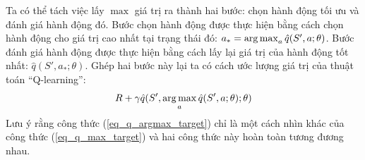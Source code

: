 	Ta có thể tách việc lấy $\max$ giá trị ra thành hai bước: chọn hành động tối ưu và đánh giá hành động đó.
	Bước chọn hành động được thực hiện bằng cách chọn hành động cho giá trị cao nhất tại trạng thái đó: $a_{*} = \operatorname*{arg\,max}_{a}\hat{q}(S', a;\theta)$.
	Bước đánh giá hành động được thực hiện bằng cách lấy lại giá trị của hành động tốt nhất: $\hat{q}(S', a_{*};\theta)$.
	Ghép hai bước này lại ta có cách ước lượng giá trị của thuật toán ``Q-learning'':
	\begin{equation}
		\label{eq_q_argmax_target}
		R + \gamma \hat{q}(S', \operatorname*{arg\,max}_{a}\hat{q}(S', a;\theta); \theta)
	\end{equation}
	Lưu ý rằng công thức (\ref{eq_q_argmax_target}) chỉ là một cách nhìn khác của công thức (\ref{eq_q_max_target}) và hai công thức này hoàn toàn tương đương nhau.
	
